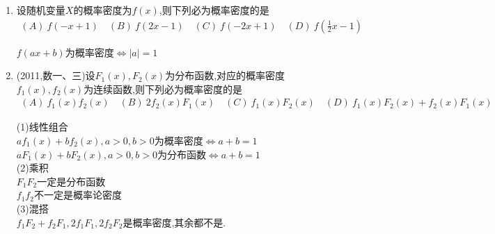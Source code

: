 \documentclass[12pt, a4paper, oneside, UTF8]{ctexbook}
\begin{document}
\begin{enumerate}[label=\arabic*.,start=3]
    \item 设随机变量$X$的概率密度为$f(x)$,则下列必为概率密度的是
    \begin{align*}
        (A)\ f(-x+1) \quad (B)\ f(2x-1) \quad (C)\ f(-2x+1) \quad (D)\ f\left(\frac{1}{2}x-1\right)
    \end{align*}
    
    
    \begin{tcolorbox}[title=总结]
        $f(ax+b)$为概率密度$\iff\left|a\right|=1$
    \end{tcolorbox}
    \item (2011,数一、三)设$F_1(x),F_2(x)$为分布函数,对应的概率密度$f_1(x),f_2(x)$为连续函数,则下列必为概率密度的是
    \begin{align*}
        (A)\ f_1(x)f_2(x) \quad (B)\ 2f_2(x)F_1(x) \quad (C)\ f_1(x)F_2(x) \quad (D)\ f_1(x)F_2(x)+f_2(x)F_1(x)
    \end{align*}
    
    \begin{tcolorbox}[title=总结]
        (1)线性组合 \\
        $af_1(x)+bf_2(x),a>0,b>0$为概率密度$\iff a+b=1$ \\
        $aF_1(x)+bF_2(x),a>0,b>0$为分布函数$\iff a+b=1$ \\
        (2)乘积 \\
        $F_1F_2$一定是分布函数 \\
        $f_1f_2$不一定是概率论密度 \\
        (3)混搭 \\
        $f_1F_2+f_2F_1,2f_1F_1,2f_2F_2$是概率密度,其余都不是.
    \end{tcolorbox}


\end{enumerate}
\end{document}
